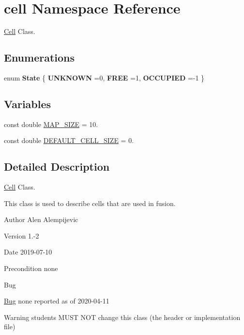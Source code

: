 \hypertarget{namespacecell}{}\section{cell Namespace Reference}
\label{namespacecell}


\hyperlink{classCell}{Cell} Class.  


\subsection*{Enumerations}
\begin{DoxyCompactItemize}
\item 
\mbox{\label{namespacecell_a1de86d3a4efd7ac1f46e84557eafe070}} 
enum {\bfseries State} \{ {\bfseries U\+N\+K\+N\+O\+WN} =0, 
{\bfseries F\+R\+EE} =1, 
{\bfseries O\+C\+C\+U\+P\+I\+ED} =-\/1
 \}
\end{DoxyCompactItemize}
\subsection*{Variables}
\begin{DoxyCompactItemize}
\item 
const double \hyperlink{namespacecell_a2bba1bb42f220c78e17a316c7e7fe5d6}{M\+A\+P\+\_\+\+S\+I\+ZE} = 10.
\item 
const double \hyperlink{namespacecell_a6515189a47fa6c3bed40b768bdec7a39}{D\+E\+F\+A\+U\+L\+T\+\_\+\+C\+E\+L\+L\+\_\+\+S\+I\+ZE} = 0.
\end{DoxyCompactItemize}


\subsection{Detailed Description}
\hyperlink{classCell}{Cell} Class. 

This class is used to describe cells that are used in fusion.~\newline
\begin{DoxyAuthor}{Author}
Alen Alempijevic 
\end{DoxyAuthor}
\begin{DoxyVersion}{Version}
1.-\/2 
\end{DoxyVersion}
\begin{DoxyDate}{Date}
2019-\/07-\/10 
\end{DoxyDate}
\begin{DoxyPrecond}{Precondition}
none 
\end{DoxyPrecond}
\begin{DoxyRefDesc}{Bug}
\item[\hyperlink{bug__bug000001}{Bug}]none reported as of 2020-\/04-\/11 \end{DoxyRefDesc}
\begin{DoxyWarning}{Warning}
students M\+U\+ST N\+OT change this class (the header or implementation file) 
\end{DoxyWarning}



